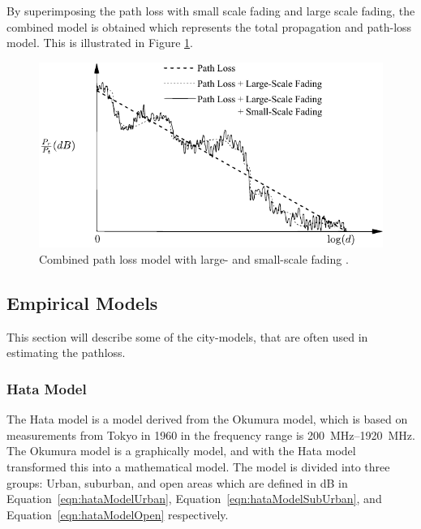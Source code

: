 By superimposing the path loss with small scale fading and large scale fading, the combined model is obtained which represents the total propagation and path-loss model. This is illustrated in Figure \ref{fig:mul_combined}. 

\begin{figure}[htbp]
    \centering
    \includegraphics{img/analysis/goldsmith_combined}
    \caption{Combined path loss model with large- and small-scale fading \cite{goldsmith2005wireless}.}
    \label{fig:mul_combined}
\end{figure}

\subsection{Empirical Models}
This section will describe some of the city-models, that are often used in estimating the pathloss. 

\subsubsection{Hata Model}
The Hata model is a model derived from the Okumura model, which is based on measurements from Tokyo in 1960 in the frequency range is \SIrange{200}{1920}{MHz}. The Okumura model is a graphically model, and with the Hata model transformed this into a mathematical model. The model is divided into three groups: Urban, suburban, and open areas which are defined in dB in Equation~\ref{eqn:hataModelUrban}, Equation~\ref{eqn:hataModelSubUrban}, and Equation~\ref{eqn:hataModelOpen} respectively\cite{Seybold2005introduction}.


